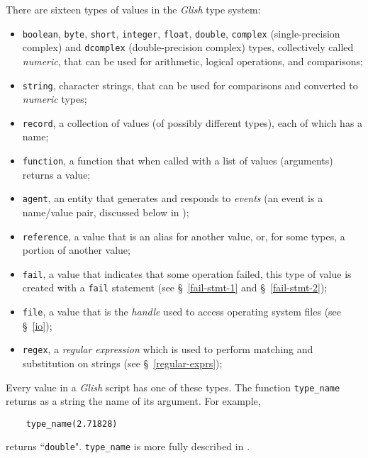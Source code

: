 There are sixteen types of values in the {\em Glish} type
system:
\begin{itemize}
\item {\tt boolean}, {\tt byte}, {\tt short},
{\tt integer}, {\tt float}, {\tt double}, {\tt complex}
(single-precision complex) and {\tt dcomplex} (double-precision complex) types, collectively 
called {\em numeric\/},  that can be used for arithmetic, 
logical operations, and comparisons;
\item {\tt string}, character strings, that can be used
for comparisons and converted to {\em numeric} types;
\item {\tt record}, a collection of values (of possibly different types),
each of which has a name;
\item {\tt function}, a function that when called with a list of
values (arguments) returns a value;
\item {\tt agent}, an entity that generates and responds to {\em events}
(an event is a name/value pair, discussed below in );
\item {\tt reference}, a value that is an alias for another value, or, for some
types, a portion of another value;
\item {\tt fail}, a value that indicates that some operation failed, this
type of value is created with a {\tt fail} statement (see
\S~\ref{fail-stmt-1} and \S~\ref{fail-stmt-2});
\item {\tt file}, a value that is the {\em handle} used to access operating
system files (see \S~\ref{io});
\item {\tt regex}, a {\em regular expression} which is used to perform matching
and substitution on strings (see \S~\ref{regular-exprs});
\end{itemize}

Every value in a {\em Glish} script has one of these types.
The function {\tt type\_name} returns as a string the name of its
argument.
For example,
\begin{verbatim}
    type_name(2.71828)
\end{verbatim}
returns ``{\tt double}".  {\tt type\_name} is more fully described in
.

